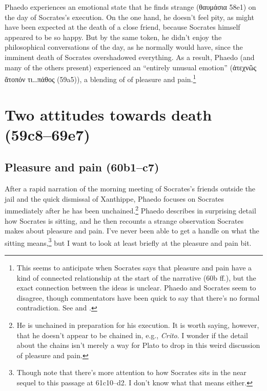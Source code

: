 \documentclass[12pt,letterpaper]{article}
\begin{document}
Phaedo experiences an emotional state that he finds strange (\textgreek{θαυμάσια} 58e1) on the day of Socrates's execution. On the one hand, he doesn't feel pity, as might have been expected at the death of a close friend, because Socrates himself appeared to be so happy. But by the same token, he didn't enjoy the philosophical conversations of the day, as he normally would have, since the imminent death of Socrates overshadowed everything. As a result, Phaedo (and many of the others present) experienced an ``entirely unusual emotion'' (\textgreek{ἀτεχνῶς ἄτοπόν τι\dots πάθος (59a5)}), a blending of of pleasure and pain.\footnote{This seems to anticipate when Socrates says that pleasure and pain have a kind of connected relationship at the start of the narrative (60b ff.), but the exact connection between the ideas is unclear. Phaedo and Socrates seem to disagree, though commentators have been quick to say that there's no formal contradiction. See \cite[\textit{ad} 59a1--b4 and 60b1--c7]{gallop1975} and \cite[\textit{ad} 59a4, 60b4, and 60b5]{rowe1993}.}

\section{Two attitudes towards death (59c8--69e7)}


\subsection{Pleasure and pain (60b1--c7)}

After a rapid narration of the morning meeting of Socrates's friends outside the jail and the quick dismissal of Xanthippe, Phaedo focuses on Socrates immediately after he has been unchained.\footnote{He is unchained in preparation for his execution. It is worth saying, however, that he doesn't appear to be chained in, e.g., \textit{Crito}. I wonder if the detail about the chains isn't merely a way for Plato to drop in this weird discussion of pleasure and pain.} Phaedo describes in surprising detail how Socrates is sitting, and he then recounts a strange observation Socrates makes about pleasure and pain. I've never been able to get a handle on what the sitting means,\footnote{Though note that there's more attention to how Socrates sits in the near sequel to this passage at 61c10--d2. I don't know what that means either.} but I want to look at least briefly at the pleasure and pain bit.
\end{document}
